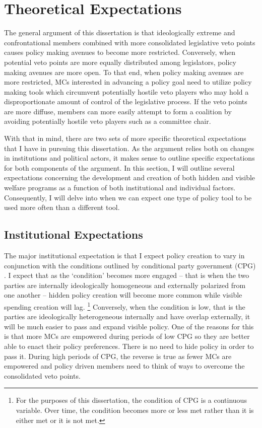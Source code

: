 \documentclass[12pt]{article}
\begin{document}
\section{Theoretical Expectations}
The general argument of this dissertation is that ideologically extreme and confrontational members combined with more consolidated legislative veto points causes policy making avenues to become more restricted. Conversely, when potential veto points are more equally distributed among legislators, policy making avenues are more open. To that end, when policy making avenues are more restricted, MCs interested in advancing a policy goal need to utilize policy making tools which circumvent potentially hostile veto players who may hold a disproportionate amount of control of the legislative process. If the veto points are more diffuse, members can more easily attempt to form a coalition by avoiding potentially hostile veto players such as a committee chair.

With that in mind, there are two sets of more specific theoretical expectations that I have in pursuing this dissertation. As the argument relies both on changes in institutions and political actors, it makes sense to outline specific expectations for both components of the argument. In this section, I will outline several expectations concerning the development and creation of both hidden and visible welfare programs as a function of both institutional and individual factors. Consequently, I will delve into when we can expect one type of policy tool to be used more often than a different tool.

\subsection{Institutional Expectations}
The major institutional expectation is that I expect policy creation to vary in conjunction with the conditions outlined by conditional party government (CPG) \citep{rohde1991}. I expect that as the `condition' becomes more engaged -- that is when the two parties are internally ideologically homogeneous and externally polarized from one another -- hidden policy creation will become more common while visible spending creation will lag. \footnote{For the purposes of this dissertation, the condition of CPG is a continuous variable. Over time, the condition becomes more or less met rather than it is either met or it is not met.} Conversely, when the condition is low, that is the parties are ideologically heterogeneous internally and have overlap externally, it will be much easier to pass  and expand visible policy. One of the reasons for this is that more MCs are empowered during periods of low CPG so they are better able to enact their policy preferences. There is no need to hide policy in order to pass it. During high periods of CPG, the reverse is true as fewer MCs are empowered and policy driven members need to think of ways to overcome the consolidated veto points.
\end{document}
